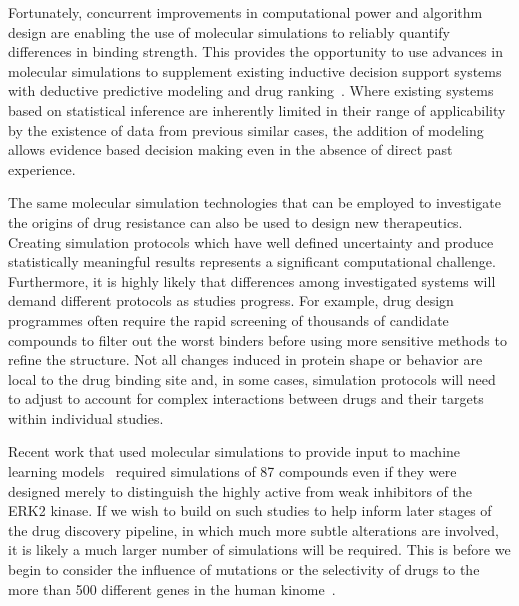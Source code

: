 \documentclass[conference]{IEEEtran}
\begin{document}
Fortunately, concurrent improvements in computational power and algorithm
design are enabling the use of molecular simulations to reliably quantify
differences in binding strength. This provides the opportunity to use advances
in molecular simulations to supplement existing inductive decision support
systems with deductive predictive modeling and drug ranking~\cite{Marias2011,
Sloot2009}. Where existing systems based on statistical inference are
inherently limited in their range of applicability by the existence of data
from previous similar cases, the addition of modeling allows evidence based
decision making even in the absence of direct past experience.

%
%
%
%
%
%
%
%

The same molecular simulation technologies that can be employed to
investigate the origins of drug resistance can also be used to design new
therapeutics. Creating simulation protocols which
%
have well defined uncertainty and produce
%
%
statistically meaningful results represents a significant
computational challenge. Furthermore, it is highly likely that differences
among %
investigated systems %
will demand different protocols
as studies progress. For example, %
drug design programmes %
often require the rapid screening of thousands of candidate compounds to filter
out the worst binders before using more sensitive methods
%
to refine the structure. Not all changes induced in protein shape or
behavior are local to the drug binding site and, in some cases, simulation
protocols will need to adjust to account for complex interactions between
drugs and their targets within individual studies.

Recent work that used molecular simulations to provide input to machine
learning models~\cite{Ash2017} required simulations of 87 compounds even if
they were designed merely to distinguish the highly active from weak
inhibitors of the ERK2 kinase. If we wish to build on such studies to help
inform later stages of the drug discovery pipeline, in which much more subtle
alterations are involved, it is likely a much larger number of simulations
will be required. This is before we begin to consider the influence of
mutations or the selectivity of drugs to the more than 500 different
genes in the human kinome~\cite{Li2016}.
\end{document}
